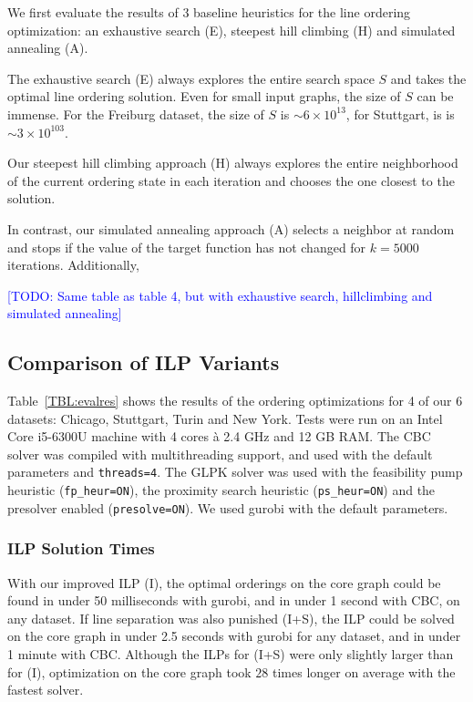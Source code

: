 \documentclass[format=acmsmall, review=false, screen=true]{acmart}
\newcommand\TODO[1]{\textcolor{blue}{\small [TODO: #1]}}
\begin{document}
We first evaluate the results of 3 baseline heuristics for the line ordering optimization: an exhaustive search (E), steepest hill climbing (H) and simulated annealing (A).

The exhaustive search (E) always explores the entire search space $S$ and takes the optimal line ordering solution. Even for small input graphs, the size of $S$ can be immense. For the Freiburg dataset, the size of $S$ is $\sim 6 \times 10^{13}$, for Stuttgart, is is $\sim 3 \times 10^{103}$.

Our steepest hill climbing approach (H) always explores the entire neighborhood of the current ordering state in each iteration and chooses the one closest to the solution.

In contrast, our simulated annealing approach (A) selects a neighbor at random and stops if the value of the target function has not changed for $k = 5000$ iterations. Additionally, 

\TODO{Same table as table 4, but with exhaustive search, hillclimbing and simulated annealing}

\subsection{Comparison of ILP Variants}

Table~\ref{TBL:evalres} shows the results of the ordering optimizations for 4 of our 6 datasets: Chicago, Stuttgart, Turin and New York. Tests were run on an Intel Core i5-6300U machine with 4 cores \`{a} 2.4 GHz and 12 GB RAM.
The CBC solver was compiled with multithreading support, and used with the default parameters and \texttt{threads=4}.
The GLPK solver was used with the feasibility pump heuristic (\texttt{fp\_heur=ON}), the proximity search heuristic (\texttt{ps\_heur=ON}) and the presolver enabled (\texttt{presolve=ON}). We used gurobi with the default parameters.
\subsubsection{ILP Solution Times} With our improved ILP (I), the optimal orderings on the core graph could be found in under 50 milliseconds with gurobi, and in under 1 second with CBC, on any dataset. If line separation was also punished (I+S), the ILP could be solved on the core graph in under 2.5 seconds with gurobi for any dataset, and in under 1 minute with CBC. Although the ILPs for (I+S) were only slightly larger than for (I), optimization on the core graph took $28$ times longer on average with the fastest solver.
\end{document}
